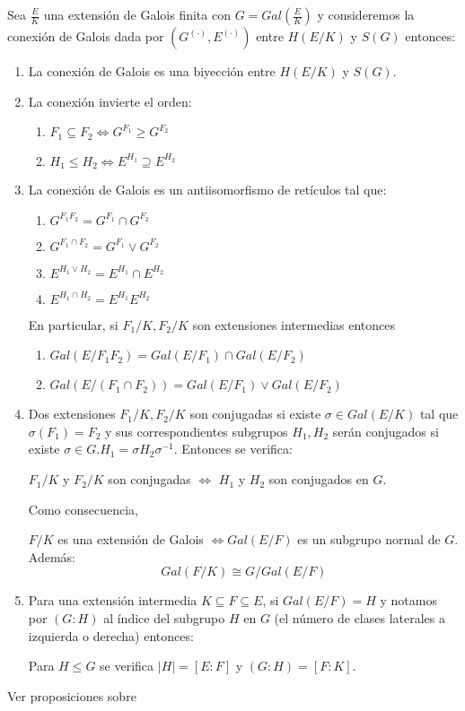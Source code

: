 \begin{theorem}
Sea $\frac{E}{K}$ una extensión de Galois finita con $G = Gal(\frac{E}{K})$ y consideremos la conexión de Galois dada por $(G^{(\cdot)},E^{(\cdot)})$ entre $H(E/K)$ y $S(G)$ entonces:

\begin{enumerate}
\item La conexión de Galois es una biyección entre $H(E/K)$ y $S(G)$. 
\item La conexión invierte el orden:

\begin{enumerate}
\item $F_1 \subseteq F_2 \iff  G^{F_1} \ge G^{F_2}$
\item $H_1 \le H_2 \iff E^{H_1} \supseteq E^{H_2}$
\end{enumerate}

\item La conexión de Galois es un antiisomorfismo de retículos tal que:

\begin{enumerate}
\item $G^{F_1F_2} = G^{F_1} \cap G^{F_2}$
\item $G^{F_1 \cap F_2} = G^{F_1} \lor G^{F_2}$
\item $E^{H_1 \lor H_2} = E^{H_1} \cap E^{H_2}$
\item $E^{H_1 \cap H_2} = E^{H_1} E^{H_2}$
\end{enumerate}  

En particular, si $F_1/K, F_2/K$ son extensiones intermedias entonces  

\begin{enumerate}
\item $Gal(E/F_1F_2) = Gal(E/F_1) \cap Gal(E/F_2)$
\item $Gal(E/(F_1 \cap F_2)) = Gal(E/F_1) \lor Gal(E/F_2)$
\end{enumerate}

\item Dos extensiones $F_1/K,F_2/K$ son conjugadas si existe $\sigma \in Gal(E/K)$ tal que $\sigma(F_1) = F_2$ y sus correspondientes subgrupos $H_1,H_2$ serán conjugados si existe $\sigma \in G. H_1 = \sigma H_2 \sigma^{-1}$. Entonces se verifica: 

$F_1/K$ y $F_2/K$ son conjugadas $\iff$ 
$H_1$ y $H_2$ son conjugados en $G$.

Como consecuencia, 

$F/K$ es una extensión de Galois $\iff Gal(E/F)$ es un subgrupo normal de $G$. Además: $$Gal(F/K) \cong G/Gal(E/F)$$
\item Para una extensión intermedia $K \subseteq F \subseteq E$, si $Gal(E/F) = H$ y notamos por $(G:H)$ al índice del subgrupo $H$ en $G$ (el número de clases laterales a izquierda o derecha) entonces:

Para $H \le G$ se verifica $|H| = [E:F]$ y $(G:H)=[F:K]$. 
\end{enumerate}
\end{theorem}

Ver proposiciones sobre 







